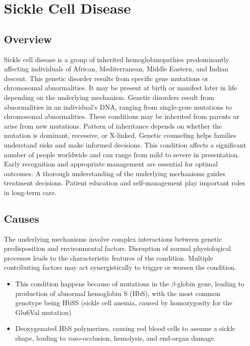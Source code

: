 \chapter{Sickle Cell Disease}
\label{sec:Sickle Cell Disease}

\section{Overview}
Sickle cell disease is a group of inherited hemoglobinopathies predominantly affecting individuals of African, Mediterranean, Middle Eastern, and Indian descent. This genetic disorder results from specific gene mutations or chromosomal abnormalities. It may be present at birth or manifest later in life depending on the underlying mechanism. Genetic disorders result from abnormalities in an individual's DNA, ranging from single-gene mutations to chromosomal abnormalities. These conditions may be inherited from parents or arise from new mutations. Pattern of inheritance depends on whether the mutation is dominant, recessive, or X-linked. Genetic counseling helps families understand risks and make informed decisions. This condition affects a significant number of people worldwide and can range from mild to severe in presentation. Early recognition and appropriate management are essential for optimal outcomes. A thorough understanding of the underlying mechanisms guides treatment decisions. Patient education and self-management play important roles in long-term care.
\section{Causes}
The underlying mechanisms involve complex interactions between genetic predisposition and environmental factors. Disruption of normal physiological processes leads to the characteristic features of the condition. Multiple contributing factors may act synergistically to trigger or worsen the condition.

\begin{itemize}[noitemsep]
  \item This condition happens because of mutations in the $\beta$-globin gene, leading to production of abnormal hemoglobin S (HbS), with the most common genotype being HbSS (sickle cell anemia, caused by homozygosity for the Glu6Val mutation)
  \item Deoxygenated HbS polymerizes, causing red blood cells to assume a sickle shape, leading to vaso-occlusion, hemolysis, and end-organ damage.
\end{itemize}
